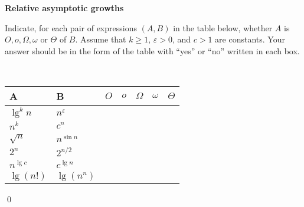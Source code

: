  \textbf{Relative asymptotic growths}

Indicate, for each pair of expressions $(A,B)$ in the table below, whether $A$ is $O, o, \Omega, \omega$ or $\Theta$ of $B$. Assume that $k \geq 1, \, \varepsilon > 0$, and $c > 1$ are constants. Your answer should be in the form of the table with ``yes'' or ``no'' written in each box.

\,

\begin{center}
\begin{tabular}{|l|l|l|l|l|l|l|}
    \hline
    A           & B                 & $O$ & $o$ & $\Omega$ & $\omega$ & $\Theta$ \\\hline
    $\lg^k n$   & $n^{\varepsilon}$ &     &     &          &          &                         \\\hline
    $n^k$       & $c^n$             &     &     &          &          &                         \\\hline
    $\sqrt{n}$  & $n^{\sin n}$      &     &     &          &          &                         \\\hline
    $2^n$       & $2^{n/2}$         &     &     &          &          &                         \\\hline
    $n^{\lg c}$ & $c^{\lg n}$       &     &     &          &          &                         \\\hline
    $\lg(n!)$   & $\lg(n^n)$        &     &     &          &          &                        \\\hline
\end{tabular}
\end{center}
\qed


